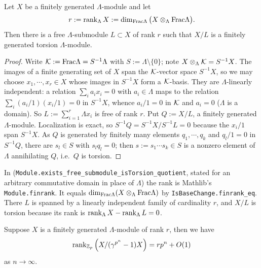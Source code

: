 \begin{lem}
\label{free-submodule-full-rank}
\leanok
Let $X$ be a finitely generated $\Lambda$-module and let
$$r:=\operatorname{rank}_\Lambda X:=\dim_{{\mathrm{Frac}}\Lambda}\big(X\otimes_\Lambda{\mathrm{Frac}}\Lambda\big).$$
Then there is a free $\Lambda$-submodule $L\subset X$ of rank $r$ such that
$X/L$ is a finitely generated torsion $\Lambda$-module.
\end{lem}

\begin{proof}
\leanok
Write ${\mathcal {K}}:={\mathrm{Frac}}\Lambda=S^{-1}\Lambda$ with $S:=\Lambda\setminus\{0\}$; note
$X\otimes_\Lambda{\mathcal {K}}=S^{-1}X$.
The images of a finite generating set of $X$ span the ${\mathcal {K}}$-vector space
$S^{-1}X$, so we may choose $x_1,\cdots,x_r\in X$ whose images in $S^{-1}X$ form
a ${\mathcal {K}}$-basis.
They are $\Lambda$-linearly independent: a relation $\sum_ia_ix_i=0$ with
$a_i\in\Lambda$ maps to the relation $\sum_i(a_i/1)(x_i/1)=0$ in $S^{-1}X$,
whence $a_i/1=0$ in ${\mathcal {K}}$ and $a_i=0$ ($\Lambda$ is a domain).
So $L:=\sum_{i=1}^r\Lambda x_i$ is free of rank $r$.
Put $Q:=X/L$, a finitely generated $\Lambda$-module.
Localization is exact, so $S^{-1}Q=S^{-1}X/S^{-1}L=0$ because the $x_i/1$ span
$S^{-1}X$.
As $Q$ is generated by finitely many elements $q_1,\cdots,q_k$ and $q_l/1=0$ in
$S^{-1}Q$, there are $s_l\in S$ with $s_lq_l=0$; then $s:=s_1\cdots s_k\in S$ is
a nonzero element of $\Lambda$ annihilating $Q$, i.e.~$Q$ is torsion.
\end{proof}

\begin{remark}
In {\Lean} (\texttt{Module.exists\_free\_submodule\_isTorsion\_quotient}, stated
for an arbitrary commutative domain in place of $\Lambda$) the rank is Mathlib's
\texttt{Module.finrank}. It equals
$\dim_{{\mathrm{Frac}}\Lambda}(X\otimes_\Lambda{\mathrm{Frac}}\Lambda)$ by
\texttt{IsBaseChange.finrank\_eq}. There $L$ is spanned by a linearly
independent family of cardinality $r$, and $X/L$ is torsion because its rank is
$\operatorname{rank}_\Lambda X-\operatorname{rank}_\Lambda L=0$.
\end{remark}

\begin{lem}\label{p:rank-growth}
\leanok
Suppose $X$ is a finitely generated $\Lambda$-module
of rank $r$,
then we have
$$
\operatorname{rank}_{{\mathbb {Z}}_p}\left(X/(\gamma^{p^n}-1)X\right)=rp^n+O(1)
$$
as $n\to\infty$.
\end{lem}

